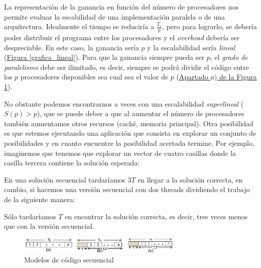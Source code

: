 \documentclass[10pt,a4paper,spanish]{report}
\begin{document}
La representación de la ganancia en función del número de procesadores nos permite evaluar la escabilidad de una implementación paralela o de una arquitectura. Idealmente el tiempo se reduciría a $\frac{T_s}{p}$, pero para lograrlo, se debería poder distribuir el programa entre los procesadores y el \textcolor[rgb]{0.2,0.4,0.8}{\textit{overhead}} debería ser despreciable. En este caso, la ganancia sería $p$ y la escalabilidad sería \textcolor[rgb]{0.2,0.4,0.8}{\textit{lineal}} (\hyperref[grafica_lineal]{Figura \ref*{grafica_lineal}}). Para que la ganancia siempre pueda ser $p$, el \textcolor[rgb]{0.2,0.4,0.8}{\textit{grado de paralelismo}} debe ser ilimitado, es decir, siempre se podrá dividir el código entre los $p$ procesadores disponibles sea cual sea el valor de $p$ (\hyperref[modelos_secuencial]{Apartado $a)$ de la Figura \ref*{modelos_secuencial}}).

No obstante podemos encontrarnos a veces con una escalabilidad \textcolor[rgb]{0.2,0.4,0.8}{\textit{superlineal}} ($S(p) > p$), que se puede deber a que al aumentar el número de procesadores también aumentamos otros recursos (caché, memoria principal). Otra posibilidad es que estemos ejecutando una aplicación que consista en explorar un conjunto de posibilidades y en cuanto encuentre la posibilidad acertada termine. Por ejemplo, imaginemos que tenemos que explorar un vector de cuatro casillas donde la casilla tercera contiene la solución esperada:

\begin{center}

\end{center}

En una solución secuencial tardaríamos $3T$ en llegar a la solución correcta, en cambio, si hacemos una versión secuencial con dos threads dividiendo el trabajo de la siguiente manera:

\begin{center}

\end{center}

Sólo tardaríamos $T$ en encontrar la solución correcta, es decir, tres veces menos que con la versión secuencial.

\begin{figure}[!h]
\centering
\includegraphics[width=0.7\textwidth]{49}
\caption{Modelos de código secuencial}
\label{modelos_secuencial}
\end{figure}
\end{document}
